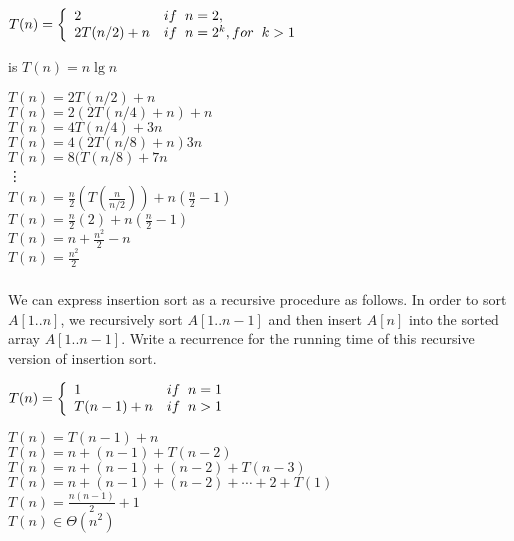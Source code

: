\documentclass[a4paper,12pt]{article}
\begin{document}
   $ T(n) =  \left \lbrace
   \begin{array}{l l l}
      2 & if \hspace{0.2cm} n = 2, \\
      2T(n/2) + n & if \hspace{0.2cm} n = 2^k, for \hspace{0.2cm} k > 1
   \end{array}
    \right. $
    
    is $T(n) = n\lg n$
    
    $T(n) = 2T(n/2) + n$ \\
    $T(n) = 2(2T(n/4) + n) + n$ \\
    $T(n) = 4T(n/4) + 3n$ \\
    $T(n) = 4(2T(n/8) + n) 3n$ \\
    $T(n) = 8(T(n/8) + 7n$ \\
    \vdots \\
    $T(n) = \frac{n}{2}(T(\frac{n}{n/2})) + n(\frac{n}{2} - 1)$ \\
    $T(n) = \frac{n}{2}(2) + n(\frac{n}{2} - 1)$ \\
    $T(n) = n + \frac{n^2}{2} - n$ \\
    $T(n) = \frac{n^2}{2}$ \\
    
    \subsubsection{} We can express insertion sort as a recursive procedure as
    follows. In order to sort $A[1..n]$, we recursively sort $A[1..n-1]$
    and then insert $A[n]$ into the sorted array $A[1..n-1]$. Write a
    recurrence for the running time of this recursive version of insertion sort.
    
    $T(n) = \left \lbrace
    \begin{array}{l l}
      1 & if \hspace{0.2cm} n = 1 \\
      T(n-1) + n & if \hspace{0.2cm} n > 1
    \end{array}
    \right.$
    
    $T(n) = T(n-1) + n$ \\
    $T(n) = n + (n-1) + T(n-2)$ \\
    $T(n) = n + (n-1) + (n-2) + T(n-3)$ \\
    $T(n) = n + (n-1) + (n-2) + \cdots + 2 +T(1)$ \\
    $T(n) = \frac{n(n-1)}{2} + 1$ \\
    $T(n) \in \Theta(n^2)$
    
\end{document}
